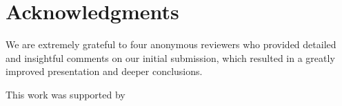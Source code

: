 \section{Acknowledgments}
\label{section:acknowledgments}

We are extremely grateful to four anonymous reviewers who provided detailed and
insightful comments on our initial submission, which resulted in a
greatly improved presentation and deeper conclusions.

This work was supported by 